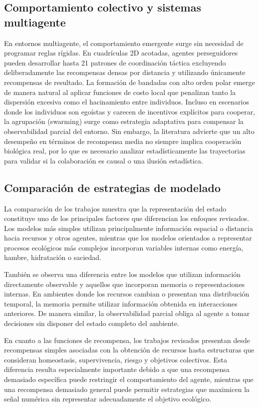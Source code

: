 \documentclass[conference]{IEEEtran}
\begin{document}
\subsection{Comportamiento colectivo y sistemas multiagente}
En entornos multiagente, el comportamiento emergente surge sin necesidad de 
programar reglas rígidas. En cuadrículas 2D acotadas, agentes perseguidores 
pueden desarrollar hasta 21 patrones de coordinación táctica excluyendo 
deliberadamente las recompensas densas por distancia y utilizando únicamente 
recompensas de resultado. La formación de bandadas con alto orden polar emerge 
de manera natural al aplicar funciones de costo local que penalizan tanto la 
dispersión excesiva como el hacinamiento entre individuos. Incluso en 
escenarios donde los individuos son egoístas y carecen de incentivos 
explícitos para cooperar, la agrupación (swarming) surge como estrategia 
adaptativa para compensar la observabilidad parcial del entorno. Sin embargo, 
la literatura advierte que un alto desempeño en términos de recompensa media 
no siempre implica cooperación biológica real, por lo que es necesario 
analizar estadísticamente las trayectorias para validar si la colaboración es 
causal o una ilusión estadística.

\subsection{Comparación de estrategias de modelado}

La comparación de los trabajos muestra que la representación del estado
constituye uno de los principales factores que diferencian los enfoques
revisados. Los modelos más simples utilizan principalmente información
espacial o distancia hacia recursos y otros agentes, mientras que los
modelos orientados a representar procesos ecológicos más complejos
incorporan variables internas como energía, hambre, hidratación o
saciedad.

También se observa una diferencia entre los modelos que utilizan
información directamente observable y aquellos que incorporan memoria o
representaciones internas. En ambientes donde los recursos cambian o
presentan una distribución temporal, la memoria permite utilizar
información obtenida en interacciones anteriores. De manera similar, la
observabilidad parcial obliga al agente a tomar decisiones sin disponer
del estado completo del ambiente.

En cuanto a las funciones de recompensa, los trabajos revisados
presentan desde recompensas simples asociadas con la obtención de
recursos hasta estructuras que consideran homeostasis, supervivencia,
riesgo y objetivos colectivos. Esta diferencia resulta especialmente
importante debido a que una recompensa demasiado específica puede
restringir el comportamiento del agente, mientras que una recompensa
demasiado general puede permitir estrategias que maximicen la señal
numérica sin representar adecuadamente el objetivo ecológico.
\end{document}
